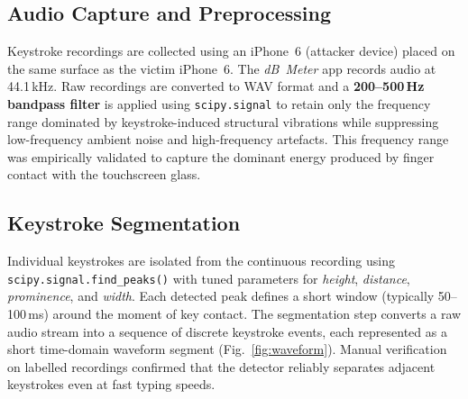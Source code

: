\documentclass[conference]{IEEEtran}
\begin{document}
\subsection{Audio Capture and Preprocessing}

Keystroke recordings are collected using an iPhone~6 (attacker device) placed on the same surface as the victim iPhone~6. The \textit{dB~Meter} app records audio at 44.1\,kHz. Raw recordings are converted to WAV format and a \textbf{200--500\,Hz bandpass filter} is applied using \texttt{scipy.signal} to retain only the frequency range dominated by keystroke-induced structural vibrations while suppressing low-frequency ambient noise and high-frequency artefacts. This frequency range was empirically validated to capture the dominant energy produced by finger contact with the touchscreen glass.

\subsection{Keystroke Segmentation}

Individual keystrokes are isolated from the continuous recording using \texttt{scipy.signal.find\_peaks()} with tuned parameters for \textit{height}, \textit{distance}, \textit{prominence}, and \textit{width}. Each detected peak defines a short window (typically 50--100\,ms) around the moment of key contact. The segmentation step converts a raw audio stream into a sequence of discrete keystroke events, each represented as a short time-domain waveform segment (Fig.~\ref{fig:waveform}). Manual verification on labelled recordings confirmed that the detector reliably separates adjacent keystrokes even at fast typing speeds.
\end{document}
